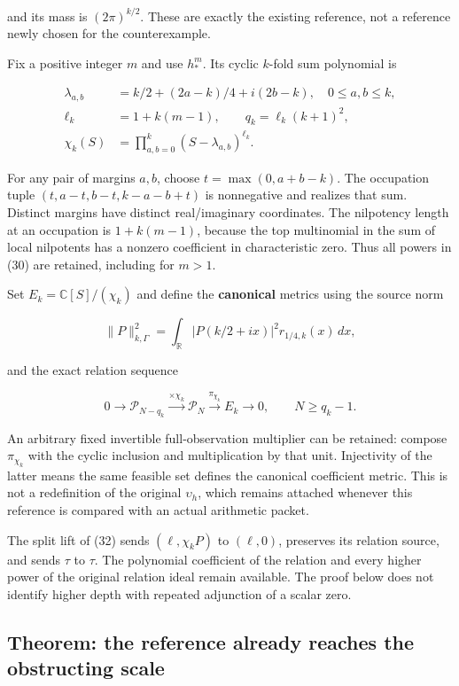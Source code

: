 \documentclass[
  11pt,
]{article}
\begin{document}
and its mass is \((2\pi)^{k/2}\). These are exactly the existing
reference, not a reference newly chosen for the counterexample.

Fix a positive integer \(m\) and use \(h_*^m\). Its cyclic \(k\)-fold
sum polynomial is

\[
\begin{aligned}
\lambda_{a,b}&=k/2+(2a-k)/4+i(2b-k),\quad 0\le a,b\le k,\\
\ell_k&=1+k(m-1),\qquad q_k=\ell_k(k+1)^2,\\
\chi_k(S)&=\prod_{a,b=0}^k(S-\lambda_{a,b})^{\ell_k}.
\end{aligned}
\tag{30}
\]

For any pair of margins \(a,b\), choose \(t=\max(0,a+b-k)\). The
occupation tuple \((t,a-t,b-t,k-a-b+t)\) is nonnegative and realizes
that sum. Distinct margins have distinct real/imaginary coordinates. The
nilpotency length at an occupation is \(1+k(m-1)\), because the top
multinomial in the sum of local nilpotents has a nonzero coefficient in
characteristic zero. Thus all powers in (30) are retained, including for
\(m>1\).

Set \(E_k=\mathbb C[S]/(\chi_k)\) and define the \textbf{canonical}
metrics using the source norm

\[
\|P\|_{k,\Gamma}^2=
\int_{\mathbb R}|P(k/2+ix)|^2r_{1/4,k}(x)\,dx,
\tag{31}
\]

and the exact relation sequence

\[
0\to\mathcal P_{N-q_k}
\xrightarrow{\times\chi_k}\mathcal P_N
\xrightarrow{\pi_{\chi_k}}E_k\to0,
\qquad N\ge q_k-1.
\tag{32}
\]

An arbitrary fixed invertible full-observation multiplier can be
retained: compose \(\pi_{\chi_k}\) with the cyclic inclusion and
multiplication by that unit. Injectivity of the latter means the same
feasible set defines the canonical coefficient metric. This is not a
redefinition of the original \(\upsilon_h\), which remains attached
whenever this reference is compared with an actual arithmetic packet.

The split lift of (32) sends \((\ell,\chi_kP)\) to \((\ell,0)\),
preserves its relation source, and sends \(\tau\) to \(\tau\). The
polynomial coefficient of the relation and every higher power of the
original relation ideal remain available. The proof below does not
identify higher depth with repeated adjunction of a scalar zero.

\subsection{Theorem: the reference already reaches the obstructing
scale}\label{theorem-the-reference-already-reaches-the-obstructing-scale}
\end{document}
